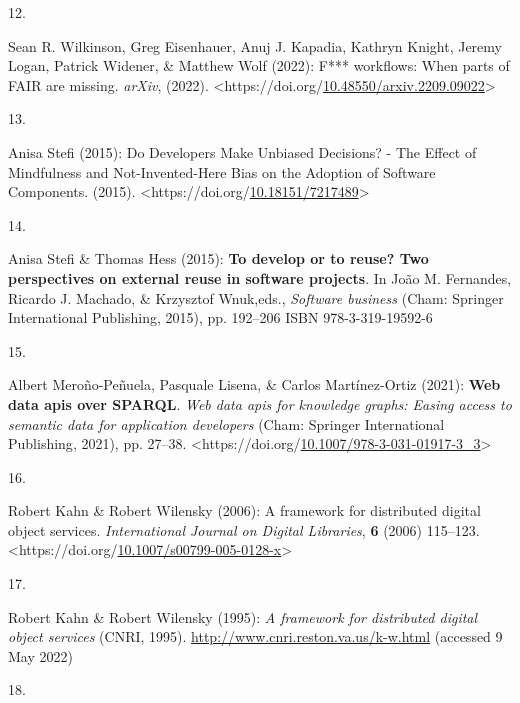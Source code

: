 \begin{thebibliography}{9}
\hypertarget{ref-wilkinsonWorkflowsWhenParts2022b}{}
12.

Sean R. Wilkinson, Greg Eisenhauer, Anuj J. Kapadia, Kathryn Knight,
Jeremy Logan, Patrick Widener, \& Matthew Wolf (2022): F*** workflows:
When parts of {FAIR} are missing. \emph{arXiv}, (2022).
\textless https://doi.org/\href{https://doi.org/10.48550/arxiv.2209.09022}{10.48550/arxiv.2209.09022}\textgreater{}

\hypertarget{ref-stefiDevelopersMakeUnbiased2015}{}
13.

Anisa Stefi (2015): Do {Developers Make Unbiased Decisions}? - {The
Effect} of {Mindfulness} and {Not-Invented-Here Bias} on the {Adoption}
of {Software Components}. (2015).
\textless https://doi.org/\href{https://doi.org/10.18151/7217489}{10.18151/7217489}\textgreater{}

\hypertarget{ref-stefiDevelopReuseTwo2015a}{}
14.

Anisa Stefi \& Thomas Hess (2015): \textbf{To develop or to reuse? {Two}
perspectives on external reuse in software projects}. In João M.
Fernandes, Ricardo J. Machado, \& Krzysztof Wnuk,eds., \emph{Software
business} ({Cham}: {Springer International Publishing}, 2015), pp.
192--206 ISBN 978-3-319-19592-6

\hypertarget{ref-merono-penuelaWebDataApis2021b}{}
15.

Albert Meroño-Peñuela, Pasquale Lisena, \& Carlos Martínez-Ortiz (2021):
\textbf{Web data apis over {SPARQL}}. \emph{Web data apis for knowledge
graphs: {Easing} access to semantic data for application developers}
({Cham}: {Springer International Publishing}, 2021), pp. 27--38.
\textless https://doi.org/\href{https://doi.org/10.1007/978-3-031-01917-3_3}{10.1007/978-3-031-01917-3\_3}\textgreater{}

\hypertarget{ref-kahnFrameworkDistributedDigital2006b}{}
16.

Robert Kahn \& Robert Wilensky (2006): A framework for distributed
digital object services. \emph{International Journal on Digital
Libraries}, \textbf{6} (2006) 115--123.
\textless https://doi.org/\href{https://doi.org/10.1007/s00799-005-0128-x}{10.1007/s00799-005-0128-x}\textgreater{}

\hypertarget{ref-kahnFrameworkDistributedDigital1995a}{}
17.

Robert Kahn \& Robert Wilensky (1995): \emph{A framework for distributed
digital object services} ({CNRI}, 1995).
\url{http://www.cnri.reston.va.us/k-w.html} (accessed 9 May 2022)

\hypertarget{ref-x1255FrameworkDiscovery}{}
18.


\end{thebibliography}
